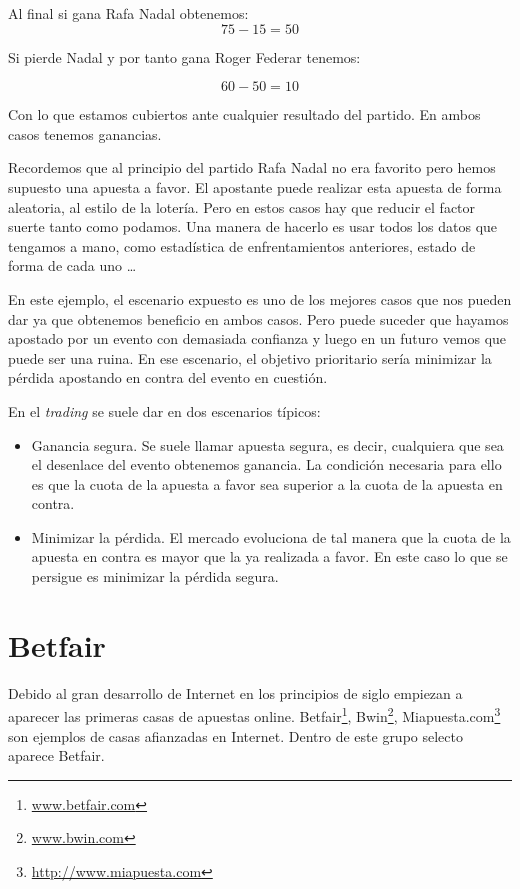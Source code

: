 Al final si gana Rafa Nadal obtenemos: 
   \begin{displaymath}
   75 - 15 = 50 
   \end{displaymath}
   
Si pierde Nadal y por tanto gana Roger Federar tenemos:
   
  \begin{displaymath}
  60 - 50 = 10 
  \end{displaymath}
       
   Con lo que estamos cubiertos ante cualquier resultado del partido. En ambos casos tenemos ganancias. 
   
   Recordemos que al principio del partido Rafa Nadal no era favorito pero hemos supuesto una apuesta a favor. El apostante puede realizar esta apuesta de forma aleatoria, al estilo de la lotería. Pero en estos casos hay que reducir el factor suerte tanto como podamos. Una manera de hacerlo es usar todos los datos que tengamos a mano, como estadística de enfrentamientos anteriores, estado de forma de cada uno \dots   
   
   En este ejemplo, el escenario expuesto es uno de los mejores casos que nos pueden dar ya que obtenemos beneficio en ambos casos. Pero puede suceder que hayamos apostado por un evento con demasiada confianza y luego en un futuro vemos que puede ser una ruina. En ese escenario, el objetivo prioritario sería minimizar la pérdida apostando en contra del evento en cuestión.

En el \emph{trading} se suele dar en dos escenarios típicos:
  
\begin{itemize}
	\item Ganancia segura.
	  Se suele llamar apuesta segura, es decir, cualquiera que sea el desenlace del evento obtenemos ganancia. La condición necesaria para ello es que la cuota de la apuesta a favor sea superior a la cuota de la apuesta en contra. 
	\item Minimizar la pérdida.
	   El mercado evoluciona de tal manera que la cuota de la apuesta en contra es mayor que la ya realizada a favor. En este caso lo que se persigue es minimizar la pérdida segura.
\end{itemize}
   
\section{Betfair}

 Debido al gran desarrollo de Internet en los principios de siglo empiezan a aparecer las primeras casas de apuestas online. Betfair\footnote{\url{www.betfair.com}}, Bwin\footnote{\url{www.bwin.com}}, Miapuesta.com\footnote{\url{http://www.miapuesta.com}} son ejemplos de casas afianzadas en Internet. Dentro de este grupo selecto aparece Betfair.

